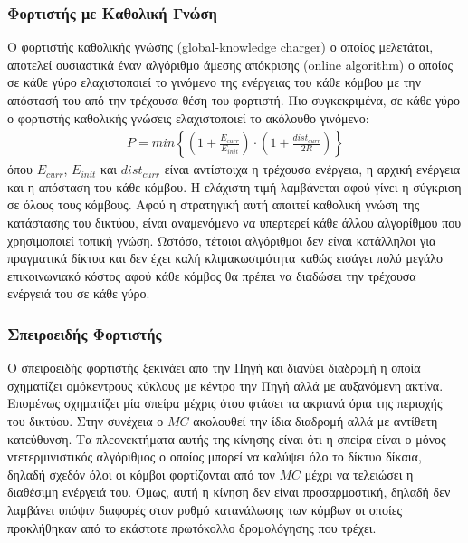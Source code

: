 \subsubsection{Φορτιστής με Καθολική Γνώση}
Ο φορτιστής καθολικής γνώσης (global-knowledge charger) ο οποίος μελετάται, αποτελεί ουσιαστικά έναν αλγόριθμο άμεσης απόκρισης (online algorithm) ο οποίος σε κάθε
γύρο ελαχιστοποιεί το γινόμενο της ενέργειας του κάθε κόμβου με την απόστασή του από την τρέχουσα θέση του φορτιστή. Πιο συγκεκριμένα, σε κάθε γύρο ο φορτιστής
καθολικής γνώσεις ελαχιστοποιεί το ακόλουθο γινόμενο:
\begin{align*}
P = min\left\{ \left(1 + \frac{E_{curr}}{E_{init}}\right) \cdot \left(1  + \frac{dist_{curr}}{2R}\right) \right\}
\end{align*}
όπου $E_{curr}$, $E_{init}$  και $dist_{curr}$ είναι αντίστοιχα η τρέχουσα ενέργεια, η αρχική ενέργεια και η απόσταση του κάθε κόμβου. Η ελάχιστη τιμή λαμβάνεται
αφού γίνει η σύγκριση σε όλους τους κόμβους. Αφού η στρατηγική αυτή απαιτεί καθολική γνώση της κατάστασης του δικτύου, είναι αναμενόμενο να υπερτερεί κάθε άλλου
αλγορίθμου που χρησιμοποιεί τοπική γνώση. Ωστόσο, τέτοιοι αλγόριθμοι δεν είναι κατάλληλοι για πραγματικά δίκτυα και δεν έχει καλή κλιμακωσιμότητα καθώς εισάγει
πολύ μεγάλο επικοινωνιακό κόστος αφού κάθε κόμβος θα πρέπει να διαδώσει την τρέχουσα ενέργειά του σε κάθε γύρο.


\subsubsection{Σπειροειδής Φορτιστής}
Ο σπειροειδής φορτιστής ξεκινάει από την Πηγή και διανύει διαδρομή η οποία σχηματίζει ομόκεντρους κύκλους με κέντρο την Πηγή αλλά με αυξανόμενη ακτίνα. Επομένως
σχηματίζει μία σπείρα μέχρις ότου φτάσει τα ακριανά όρια της περιοχής του δικτύου. Στην συνέχεια  ο $MC$ ακολουθεί την ίδια διαδρομή αλλά με αντίθετη κατεύθυνση. Τα
πλεονεκτήματα αυτής της κίνησης είναι ότι η σπείρα είναι ο μόνος ντετερμινιστικός αλγόριθμος ο οποίος μπορεί να καλύψει όλο το δίκτυο δίκαια, δηλαδή σχεδόν όλοι οι
κόμβοι φορτίζονται από τον $MC$ μέχρι να τελειώσει η διαθέσιμη ενέργειά του. Όμως, αυτή η κίνηση δεν είναι προσαρμοστική, δηλαδή δεν  λαμβάνει υπόψιν διαφορές στον
ρυθμό κατανάλωσης των κόμβων οι οποίες προκλήθηκαν από το εκάστοτε πρωτόκολλο δρομολόγησης που τρέχει.

